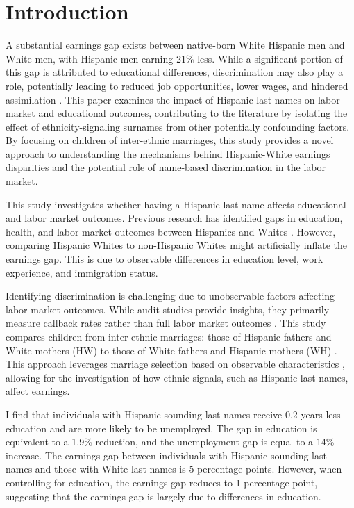 \documentclass[a4paper,fleqn]{cas-sc}
\begin{document}

\section{Introduction}

A substantial earnings gap exists between native-born White Hispanic men and White men, with Hispanic men earning 21\% less. While a significant portion of this gap is attributed to educational differences, discrimination may also play a role, potentially leading to reduced job opportunities, lower wages, and hindered assimilation \citep{duncan2006hispanics, duncan2018identifying, duncan2018socioeconomic}. This paper examines the impact of Hispanic last names on labor market and educational outcomes, contributing to the literature by isolating the effect of ethnicity-signaling surnames from other potentially confounding factors. By focusing on children of inter-ethnic marriages, this study provides a novel approach to understanding the mechanisms behind Hispanic-White earnings disparities and the potential role of name-based discrimination in the labor market.

This study investigates whether having a Hispanic last name affects educational and labor market outcomes. Previous research has identified gaps in education, health, and labor market outcomes between Hispanics and Whites \citep{antman2020ethnic, davilaChangesRelativeEarnings2008}. However, comparing Hispanic Whites to non-Hispanic Whites might artificially inflate the earnings gap. This is due to observable differences in education level, work experience, and immigration status.

Identifying discrimination is challenging due to unobservable factors affecting labor market outcomes. While audit studies provide insights, they primarily measure callback rates rather than full labor market outcomes \citep{bertrand2004emily}. This study compares children from inter-ethnic marriages: those of Hispanic fathers and White mothers (HW) to those of White fathers and Hispanic mothers (WH) \citep{rubinstein2014pride}. This approach leverages marriage selection based on observable characteristics \citep{averettBetterWorseRelationship2008}, allowing for the investigation of how ethnic signals, such as Hispanic last names, affect earnings.

I find that individuals with Hispanic-sounding last names receive 0.2 years less education and are more likely to be unemployed. The gap in education is equivalent to a 1.9\% reduction, and the unemployment gap is equal to a 14\% increase. The earnings gap between individuals with Hispanic-sounding last names and those with White last names is 5 percentage points. However, when controlling for education, the earnings gap reduces to 1 percentage point, suggesting that the earnings gap is largely due to differences in education.
\end{document}
